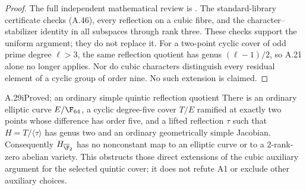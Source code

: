 \begin{proof}
The full independent mathematical review is
.
The standard-library certificate
checks (A.46), every reflection on a cubic fibre,
and the character--stabilizer identity in all
subspaces through rank three. These checks support
the uniform argument; they do not replace it.
For a two-point cyclic cover of odd prime degree
$\ell>3$, the same reflection quotient has genus
$(\ell-1)/2$, so A.21 alone no longer applies.
Nor do cubic characters distinguish every residual
element of a cyclic group of order nine. No such
extension is claimed.
\end{proof}

\begin{claim}{A.29i}{Proved; an ordinary simple quintic reflection quotient}
There is an ordinary elliptic curve $E/\F_{64}$, a cyclic
degree-five cover $T/E$ ramified at exactly two points
whose difference has order five, and a lifted reflection
$\tau$ such that $H=T/\langle\tau\rangle$ has genus two
and an ordinary geometrically simple Jacobian.
Consequently $H_{\overline{\F}_2}$ has no nonconstant map
to an elliptic curve or to a $2$-rank-zero abelian variety.
This obstructs those direct extensions of the cubic
auxiliary argument for the selected quintic cover; it
does not refute A1 or exclude other auxiliary choices.
\end{claim}
